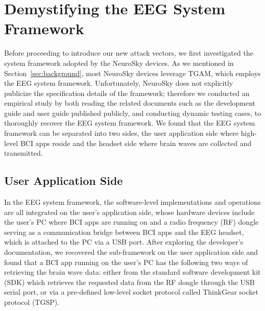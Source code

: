 \section{Demystifying the EEG System Framework}
\label{sec:framework}

Before proceeding to introduce our new attack vectors, we first investigated the system framework adopted by the NeuroSky devices. As we mentioned in Section~\ref{sec:background}, most NeuroSky devices leverage TGAM, which employs the EEG system framework. Unfortunately, NeuroSky does not explicitly publicize the specification details of the framework; therefore we conducted an empirical study by both reading the related documents such as the development guide and user guide published publicly, and conducting dynamic testing cases, to thoroughly recover the EEG system framework. We found that the EEG system framework can be separated into two sides, the user application side where high-level BCI apps reside and the headset side where brain waves are collected and transmitted. 

\subsection{User Application Side}
In the EEG system framework, the software-level implementations and operations are all integrated on the user's application side, whose hardware devices include the user's PC where BCI apps are running on and a radio frequency (RF) dongle serving as a communication bridge between BCI apps and the EEG headset, which is attached to the PC via a USB port. After exploring the developer's documentation, we recovered the sub-framework on the user application side and found that a BCI app running on the user's PC has the following two ways of retrieving the brain wave data: either from the standard software development kit (SDK) which retrieves the requested data from the RF dongle through the USB serial port, or via a pre-defined low-level socket protocol called ThinkGear socket protocol (TGSP). 

